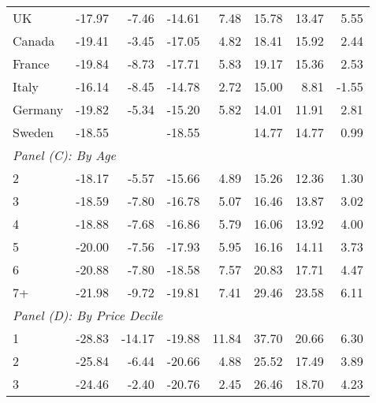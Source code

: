 \begin{table}
\begin{tabular}{lrrrrrrr}
	UK      &          -17.97 &      -7.46 &         -14.61 &      7.48 &            15.78 &          13.47 &  5.55 \\
	Canada  &          -19.41 &      -3.45 &         -17.05 &      4.82 &            18.41 &          15.92 &  2.44 \\
	France  &          -19.84 &      -8.73 &         -17.71 &      5.83 &            19.17 &          15.36 &  2.53 \\
	Italy   &          -16.14 &      -8.45 &         -14.78 &      2.72 &            15.00 &           8.81 & -1.55 \\
	Germany &          -19.82 &      -5.34 &         -15.20 &      5.82 &            14.01 &          11.91 &  2.81 \\
	Sweden  &          -18.55 &            &         -18.55 &           &            14.77 &          14.77 &  0.99 \\ \hline
	\multicolumn{8}{l}{\textit{Panel (C): By Age}}                                                                  \\ \hline
	2       &          -18.17 &      -5.57 &         -15.66 &      4.89 &            15.26 &          12.36 &  1.30 \\
	3       &          -18.59 &      -7.80 &         -16.78 &      5.07 &            16.46 &          13.87 &  3.02 \\
	4       &          -18.88 &      -7.68 &         -16.86 &      5.79 &            16.06 &          13.92 &  4.00 \\
	5       &          -20.00 &      -7.56 &         -17.93 &      5.95 &            16.16 &          14.11 &  3.73 \\
	6       &          -20.88 &      -7.80 &         -18.58 &      7.57 &            20.83 &          17.71 &  4.47 \\
	7+      &          -21.98 &      -9.72 &         -19.81 &      7.41 &            29.46 &          23.58 &  6.11 \\ \hline
	\multicolumn{8}{l}{\textit{Panel (D): By Price Decile}}                                                         \\ \hline
	1       &          -28.83 &     -14.17 &         -19.88 &     11.84 &            37.70 &          20.66 &  6.30 \\
	2       &          -25.84 &      -6.44 &         -20.66 &      4.88 &            25.52 &          17.49 &  3.89 \\
	3       &          -24.46 &      -2.40 &         -20.76 &      2.45 &            26.46 &          18.70 &  4.23 \\

\end{tabular}
\end{table}
